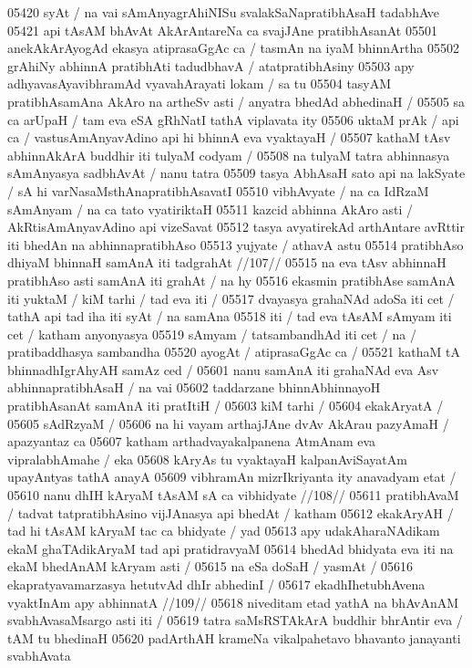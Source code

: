 05420 syAt / na vai sAmAnyagrAhiNISu svalakSaNapratibhAsaH tadabhAve  
05421 api tAsAM bhAvAt AkArAntareNa ca svajJAne pratibhAsanAt
05501 anekAkArAyogAd ekasya atiprasaGgAc ca / tasmAn na iyaM bhinnArtha
05502 grAhiNy abhinnA pratibhAti tadudbhavA / atatpratibhAsiny  
05503 apy adhyavasAyavibhramAd vyavahArayati lokam / sa tu
05504 tasyAM pratibhAsamAna AkAro na artheSv asti / anyatra bhedAd abhedinaH /
05505 sa ca arUpaH / tam eva eSA gRhNatI tathA viplavata ity 
05506 uktaM prAk / api ca / vastusAmAnyavAdino api hi bhinnA eva vyaktayaH /
05507 kathaM tAsv abhinnAkArA buddhir iti tulyaM codyam /  
05508 na tulyaM tatra abhinnasya sAmAnyasya sadbhAvAt / nanu tatra 
05509 tasya AbhAsaH sato api na lakSyate / sA hi varNasaMsthAnapratibhAsavatI
05510 vibhAvyate / na ca IdRzaM sAmAnyam / na ca tato vyatiriktaH  
05511 kazcid abhinna AkAro asti / AkRtisAmAnyavAdino api vizeSavat  
05512 tasya avyatirekAd arthAntare avRttir iti bhedAn na abhinnapratibhAso
05513 yujyate / athavA astu 
05514 	pratibhAso dhiyaM bhinnaH samAnA iti tadgrahAt //107//  
05515 na eva tAsv abhinnaH pratibhAso asti samAnA iti grahAt / na hy 
05516 ekasmin pratibhAse samAnA iti yuktaM / kiM tarhi / tad eva iti / 
05517 dvayasya grahaNAd adoSa iti cet / tathA api tad iha iti syAt / na samAna
05518 iti / tad eva tAsAM sAmyam iti cet / katham anyonyasya  
05519 sAmyam / tatsambandhAd iti cet / na / pratibaddhasya sambandha  
05520 ayogAt /  atiprasaGgAc ca /
05521 	kathaM tA bhinnadhIgrAhyAH samAz ced /  
05601 nanu samAnA iti grahaNAd eva Asv abhinnapratibhAsaH / na vai  
05602 taddarzane bhinnAbhinnayoH pratibhAsanAt samAnA iti pratItiH / 
05603 kiM tarhi /
05604 	ekakAryatA /  
05605 	sAdRzyaM /
05606 na hi vayam arthajJAne dvAv AkArau pazyAmaH / apazyantaz ca
05607 katham arthadvayakalpanena AtmAnam eva vipralabhAmahe / eka
05608 kAryAs tu vyaktayaH kalpanAviSayatAm upayAntyas tathA anayA 
05609 vibhramAn mizrIkriyanta ity anavadyam etat / 
05610 	nanu dhIH kAryaM tAsAM sA ca vibhidyate //108//  
05611 pratibhAvaM / tadvat tatpratibhAsino vijJAnasya api bhedAt / katham  
05612 ekakAryAH / tad hi tAsAM kAryaM tac ca bhidyate / yad
05613 apy udakAharaNAdikam ekaM ghaTAdikAryaM tad api pratidravyaM
05614 bhedAd bhidyata eva iti na ekaM bhedAnAM kAryam asti / 
05615 na eSa doSaH / yasmAt /  
05616 	ekapratyavamarzasya hetutvAd dhIr abhedinI /
05617 	ekadhIhetubhAvena vyaktInAm apy abhinnatA //109//
05618 niveditam etad yathA na bhAvAnAM svabhAvasaMsargo asti iti /  
05619 tatra saMsRSTAkArA buddhir bhrAntir eva / tAM tu bhedinaH 
05620 padArthAH krameNa vikalpahetavo bhavanto janayanti svabhAvata
